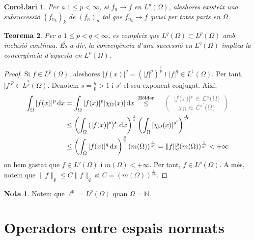 \documentclass[12pt]{book}
\newtheorem{teorema}{Teorema}[chapter]
\newtheorem{coro}[teorema]{Coro\l.lari}
\theoremstyle{definition}
\theoremstyle{nota}
\newtheorem*{nota*}{Nota}
\theoremstyle{exemple}
\begin{document}
\begin{coro}
  Per a $1 \leq p < \infty$, si $f_n \to f$ en $L^p(\Omega)$,
  aleshores existeix una subsuccessió $(f_{n_k})_k$ de $(f_n)_n$ tal
  que $f_{n_k} \to f$ quasi per totes parts en $\Omega$.
\end{coro}

\begin{teorema}
  Per a $1 \leq p < q < \infty$, es compleix que
  $L^q(\Omega) \subset L^p(\Omega)$ amb inclusió contínua. És a dir,
  la convergència d'una successió en $L^q(\Omega)$ implica la
  convergència d'aquesta en $L^p(\Omega)$.
\end{teorema}

\begin{proof}
  Si $f \in L^p(\Omega)$, aleshores $|f(x)|^q = (|f|^p)^{\frac{q}{p}}$
  i $|f|^q \in L^1(\Omega)$. Per tant,
  $|f|^p \in L^{\frac{q}{p}}(\Omega)$. Denotem $s = \frac{q}{p} > 1$ i
  $s'$ el seu exponent conjugat. Així,
  \begin{align*}
    \int_\Omega |f(x)|^p\, \mathrm{d}x
    &= \int_\Omega |f(x)|^p |\chi_\Omega(x)|\, \mathrm{d}x \;
      \overset{\text{Hölder}}{\leq} \;
      \textcolor{gray}{
      \quad
      \left(
      \begin{array}{c}
        |f(x)|^p \in \mathcal{L}^s(\Omega) \\
        \chi_\Omega \in \mathcal{L}^{s'}(\Omega)
      \end{array}\right)} \\
    &\leq \left( \int_\Omega \left(|f(x)|^{p}\right)^s
      \, \mathrm{d}x \right)^{\frac{1}{s}}
      \left( \int_\Omega |\chi_\Omega(x)|^{s'} \right)^{\frac{1}{s'}} \\
    &\leq \left( \int_\Omega |f(x)|^{q}
      \, \mathrm{d}x \right)^{\frac{p}{q}}
      \left( m(\Omega) \right)^{\frac{1}{s'}}
      = \|f\|_q^p(m(\Omega))^{\frac{1}{s'}} < +\infty
  \end{align*}
  on hem gastat que $f \in L^q(\Omega)$ i $m(\Omega) < +\infty$. Per
  tant, $f \in L^p(\Omega)$. A més, notem que $\|f\|_p \leq C \|f\|_q$
  si $C = (m(\Omega))^{\frac{1}{sp}}$.
\end{proof}

\begin{nota*}
  Notem que $\ell^p = L^p(\Omega)$ quan $\Omega = \mathbb{N}$.
\end{nota*}

\section{Operadors entre espais normats}
\end{document}
